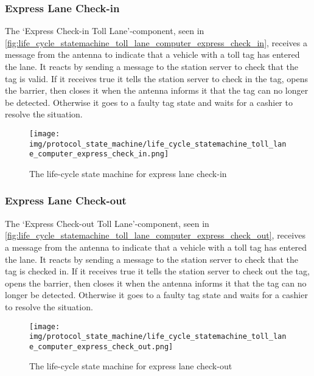 \subsubsection*{Express Lane Check-in}
The ‘Express Check-in Toll Lane’-component, seen in \autoref{fig:life_cycle_statemachine_toll_lane_computer_express_check_in}, receives a message from the antenna to indicate that a vehicle with a toll tag has entered the lane. It reacts by sending a message to the station server to check that the tag is valid. If it receives true it tells the station server to check in the tag, opens the barrier, then closes it when the antenna informs it that the tag can no longer be detected.  Otherwise it goes to a faulty tag state and waits for a cashier to resolve the situation. 
\begin{figure}[H]
\centering
\texttt{[image: img/protocol\_state\_machine/life\_cycle\_statemachine\_toll\_lane\_computer\_express\_check\_in.png]}
\caption{The life-cycle state machine for express lane check-in}
\label{fig:life_cycle_statemachine_toll_lane_computer_express_check_in}
\end{figure}

\subsubsection*{Express Lane Check-out}
The ‘Express Check-out Toll Lane’-component, seen in \autoref{fig:life_cycle_statemachine_toll_lane_computer_express_check_out}, receives a message from the antenna to indicate that a vehicle with a toll tag has entered the lane. It reacts by sending a message to the station server to check that the tag is checked in. If it receives true it tells the station server to check out the tag, opens the barrier, then closes it when the antenna informs it that the tag can no longer be detected.  Otherwise it goes to a faulty tag state and waits for a cashier to resolve the situation. 
\begin{figure}[H]
\centering
\texttt{[image: img/protocol\_state\_machine/life\_cycle\_statemachine\_toll\_lane\_computer\_express\_check\_out.png]}
\caption{The life-cycle state machine for express lane check-out}
\label{fig:life_cycle_statemachine_toll_lane_computer_express_check_out}
\end{figure}

